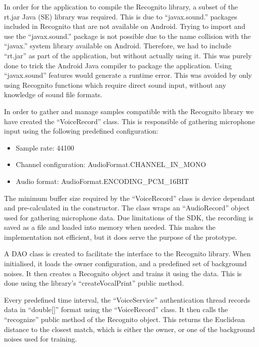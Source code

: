 In order for the application to compile the Recognito library, a subset of the rt.jar Java (SE) library was required. This is due to ``javax.sound.'' packages included in Recognito that are not available on Android. Trying to import and use the ``javax.sound.'' package is not possible due to the name collision with the ``javax.'' system library available on Android. Therefore, we had to include ``rt.jar'' as part of the application, but without actually using it. This was purely done to trick the Android Java compiler to package the application. Using ``javax.sound'' features would generate a runtime error. This was avoided by only using Recognito functions which require direct sound input, without any knowledge of sound file formats.

In order to gather and manage samples compatible with the Recognito library we have created the ``VoiceRecord'' class. This is responsible of gathering microphone input using the following predefined configuration:
\begin{itemize}
	\item Sample rate: 44100
	\item Channel configuration: AudioFormat.CHANNEL\_IN\_MONO
	\item Audio format: AudioFormat.ENCODING\_PCM\_16BIT
\end{itemize}

The minimum buffer size required by the ``VoiceRecord'' class is device dependant and pre-calculated in the constructor. The class wraps an ``AudioRecord'' object used for gathering microphone data. Due limitations of the SDK, the recording is saved as a file and loaded into memory when needed. This makes the implementation not efficient, but it does serve the purpose of the prototype.

A DAO class is created to facilitate the interface to the Recognito library. When initialised, it loads the owner configuration, and a predefined set of background noises. It then creates a Recognito object and trains it using the data. This is done using the library's ``createVocalPrint'' public method.

Every predefined time interval, the ``VoiceService'' authentication thread records data in ``double[]'' format using the ``VoiceRecord'' class. It then calls the ``recognize'' public method of the Recognito object. This returns the Euclidean distance to the closest match, which is either the owner, or one of the background noises used for training. 

